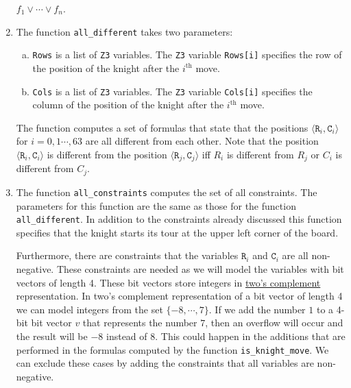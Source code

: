 \begin{enumerate}
      $f_1 \vee \cdots \vee f_n$.
\item The function \texttt{all\_different} takes two parameters:
      \begin{enumerate}[(a)]
      \item \texttt{Rows} is a list of \texttt{Z3} variables. The \texttt{Z3} variable \texttt{Rows[i]}
            specifies the row of the position of the knight after the $i^{\textrm{th}}$ move. 
      \item \texttt{Cols} is a list of \texttt{Z3} variables. The \texttt{Z3} variable \texttt{Cols[i]}
            specifies the column of the position of the knight after the $i^{\textrm{th}}$ move. 
      \end{enumerate}
      The function computes a set of formulas that state that the positions
      $\langle \mathtt{R}_i, \mathtt{C}_i \rangle$ for $i=0,1\cdots, 63$ are all different from each other.
      Note that the position $\langle \mathtt{R}_i, \mathtt{C}_i \rangle$ is different from the position
      $\langle \mathtt{R}_j, \mathtt{C}_j \rangle$ iff $R_i$ is different from $R_j$ or $C_i$ is different from
      $C_j$. 
\item The function \texttt{all\_constraints} computes the set of all constraints.
      The parameters for this function are the same as those for the function \texttt{all\_different}.
      In addition to the constraints already discussed this function specifies that the knight starts
      its tour at the upper left corner of the board.

      Furthermore, there are constraints that the variables $\mathtt{R}_i$ and $\mathtt{C}_i$ are all
      non-negative.  These constraints are needed as we will model the variables with bit vectors of length 4.
      These bit vectors store integers in
      \href{https://en.wikipedia.org/wiki/Two%27s_complement}{two's complement} representation.
      In two's complement representation of a bit vector of length 4 we can model integers from the set
      $\{-8, \cdots, 7\}$.  If we add the number $1$ to a 4-bit bit vector $v$ that represents the number $7$,
      then an overflow will occur and the result will be $-8$ instead of $8$. This could happen in the
      additions that are performed in the formulas computed by the function \texttt{is\_knight\_move}.
      We can exclude these cases by adding the constraints that all variables are non-negative.
\end{enumerate}

